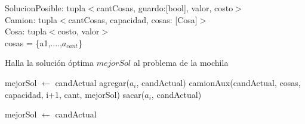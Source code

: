 \noindent
SolucionPosible: tupla$<$cantCosas, guardo:[bool], valor, costo$>$ \\
Camion: tupla$<$cantCosas, capacidad, cosas: [Cosa]$>$ \\
Cosa: tupla$<$costo, valor$>$ \\
cosas = \{a1,....,$a_{cant}$\} \\

\begin{algorithm}
\caption{Halla la solución óptima $mejorSol$ al problema de la mochila}
\begin{algorithmic}[1]
        \STATE mejorSol $\leftarrow$ candActual
    \ELSE
                    \STATE agregar($a_i$, candActual)
                    \STATE camionAux(candActual, cosas, capacidad, i+1, cant, mejorSol)
                    \STATE sacar($a_i$, candActual)
                \ENDIF
            \ENDFOR

                \STATE mejorSol $\leftarrow$ candActual
            \ENDIF
        \ENDIF
    \ENDIF
\end{algorithmic}
\end{algorithm}
